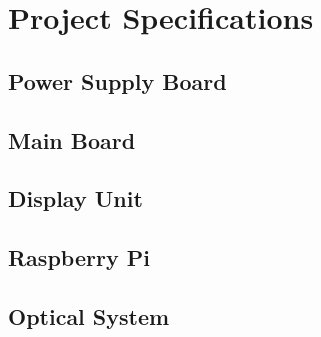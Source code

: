 \chapter{Project Specifications}





\section{Power Supply Board}

\section{Main Board}

\section{Display Unit}

\section{Raspberry Pi}

\section{Optical System}
